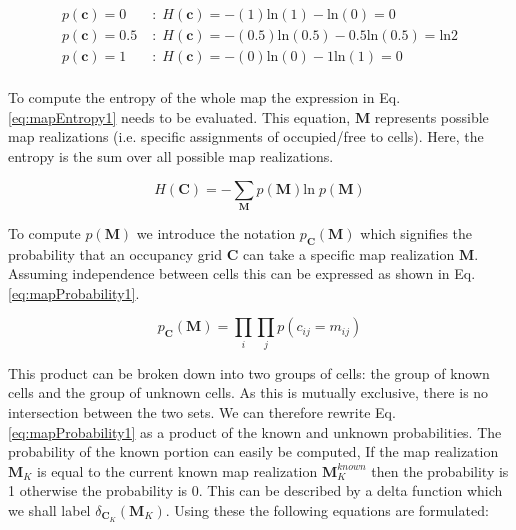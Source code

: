 \documentclass[a4paper,12pt]{article}
\begin{document}
			\begin{align}
				\nonumber p\left(\textbf{c}\right) = 0 \; &: \; H \left(\textbf{c}\right) = -(1)\text{ln}(1)-\text{ln}(0) = 0 \\
				\nonumber p\left(\textbf{c}\right) = 0.5 \; &: \; H \left(\textbf{c}\right) = -(0.5)\text{ln}(0.5)-0.5\text{ln}(0.5) = \text{ln}2 \\
				\nonumber p\left(\textbf{c}\right) = 1 \; &: \; H \left(\textbf{c}\right) = -(0)\text{ln}(0)-1\text{ln}(1) = 0 \\
			\end{align}

			To compute the entropy of the whole map the expression in Eq. \ref{eq:mapEntropy1} needs to be evaluated. This equation, $\textbf{M}$ represents possible map realizations (i.e. specific assignments of occupied/free to cells). Here, the entropy is the sum over all possible map realizations.

			\begin{equation}
				H \left(\textbf{C}\right) = - \sum_{\textbf{M}} p\left(\textbf{M}\right) \text{ln} \; p\left(\textbf{M}\right)
				\label{eq:mapEntropy1}
			\end{equation}
			
			To compute $p(\textbf{M})$ we introduce the notation $p_\textbf{C}(\textbf{M})$ which signifies the probability that an occupancy grid $\textbf{C}$ can take a specific map realization $\textbf{M}$. Assuming independence between cells this can be expressed as shown in Eq. \ref{eq:mapProbability1}.
			
			\begin{equation}
				p_\textbf{C}(\textbf{M}) = \prod_{i} \prod_{j} p(c_{ij} = m_{ij})
				\label{eq:mapProbability1}
			\end{equation}
			
			This product can be broken down into two groups of cells: the group of known cells and the group of unknown cells. As this is mutually exclusive, there is no intersection between the two sets. We can therefore rewrite Eq. \ref{eq:mapProbability1} as a product of the known and unknown probabilities. The probability of the known portion can easily be computed, If the map realization $\textbf{M}_K$ is equal to the current known map realization $\textbf{M}_K^{known}$ then the probability is 1 otherwise the probability is 0. This can be described by a delta function which we shall label $\delta_{\textbf{C}_K}(\textbf{M}_K)$. Using these the following equations are formulated:
\end{document}
